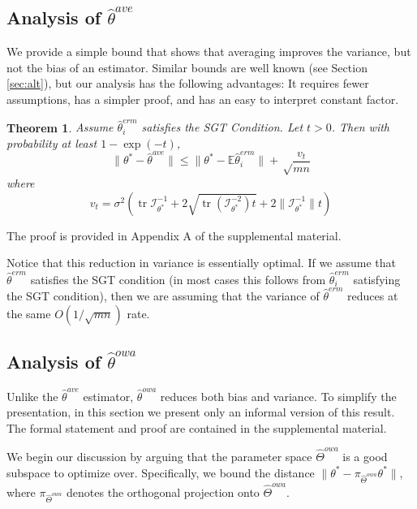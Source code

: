 \documentclass[twoside]{article}
\newtheorem{theorem}{Theorem}
\DeclareMathOperator*{\tr}{tr}
\newcommand{\nowa}{n^{\textit{owa}}}
\newcommand{\W}{{\hat \Theta^{\textit{owa}}}}
\newcommand{\Wowa}{{\hat \Theta^{\textit{owa}}}}
\newcommand{\E}{\mathbb{E}}
\newcommand{\w}{\theta}
\newcommand{\wowa}{\hat\w^{owa}}
\newcommand{\wave}{\hat\w^{ave}}
\newcommand{\wmle}{\hat\w^{erm}}
\newcommand{\wstar}{{\w^{*}}}
\newcommand{\I}{\mathcal I}
\newcommand{\ltwo}[1]{{\lVert {#1} \rVert}}
\newcommand{\proj}[1]{\pi_{{#1}}}
\begin{document}
\subsection{Analysis of $\wave$}

We provide a simple bound that shows that averaging improves the variance,
but not the bias of an estimator.
Similar bounds are well known (see Section \ref{sec:alt}),
but our analysis has the following advantages:
It requires fewer assumptions, has a simpler proof, and has an easy to interpret constant factor.

\begin{theorem}
\label{thm:wave}
Assume $\wmle_i$ satisfies the SGT Condition.
Let $t>0$.
Then with probability at least $1-\exp(-t)$,
\begin{equation}
\ltwo{\wstar-\wave} \le \ltwo{\wstar-\E\wmle_i} + \sqrt\frac{v_t}{mn}
\end{equation}
where
\begin{equation}
v_t =
\sigma^2
\left(
\tr{\I^{-1}_{\wstar}}
+ 2\sqrt{\tr \left({\I^{-2}_{\wstar}}\right)t}
+ 2\ltwo{\I^{-1}_{\wstar}}t
\right)
\label{eq:vt}
\end{equation}
\end{theorem}

The proof is provided in Appendix A of the supplemental material.

Notice that this reduction in variance is essentially optimal.
If we assume that $\wmle$ satisfies the SGT condition
(in most cases this follows from $\wmle_i$ satisfying the SGT condition),
then we are assuming that the variance of $\wmle$ reduces at the same $O(1/\sqrt{mn})$ rate.


\subsection {Analysis of $\wowa$}

Unlike the $\wave$ estimator,
$\wowa$ reduces both bias and variance.
To simplify the presentation, in this section we present only an informal version of this result.
The formal statement and proof are contained in the supplemental material.

We begin our discussion by arguing that the parameter space $\Wowa$ is a good subspace to optimize over.
Specifically, we bound the distance $\ltwo{\wstar-\proj{\W}\wstar}$,
where $\proj{\W}$ denotes the orthogonal projection onto $\W$.
\end{document}
